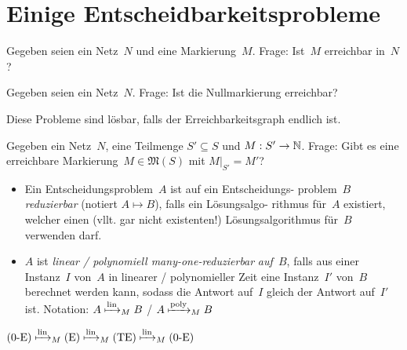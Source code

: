 \documentclass{cheat-sheet}
\newcommand{\Markings}{\mathfrak{M}} %
\newcommand{\reducesTo}{\mapsto} %
\newcommand{\reducesManyOneToLin}{\xmapsto{\mathrm{lin}}_M} %
\newcommand{\reducesManyOneToPoly}{\xmapsto{\mathrm{poly}}_M} %
\begin{document}

\section{Einige Entscheidbarkeitsprobleme}

\begin{problem}
  Gegeben seien ein Netz~$N$ und eine Markierung~$M$.
  Frage: Ist~$M$ erreichbar in~$N$?
\end{problem}

\begin{problem}
  Gegeben seien ein Netz~$N$.
  Frage: Ist die Nullmarkierung erreichbar?
\end{problem}

\begin{bem}
  Diese Probleme sind lösbar, falls der Erreichbarkeitsgraph endlich ist.
\end{bem}

\begin{problem}
  Gegeben ein Netz~$N$, eine Teilmenge $S' \subseteq S$ und $M : S' \to \mathbb{N}$.
  Frage: Gibt es eine erreichbare Markierung~$M \in \Markings(S)$ mit $M|_{S'} = M'$?
\end{problem}


\begin{defn}
  \begin{itemize}
    \item Ein Entscheidungsproblem~$A$ ist auf ein Entscheidungs- problem~$B$ \emph{reduzierbar} (notiert $A \reducesTo B$), falls ein Lösungsalgo- rithmus für~$A$ existiert, welcher einen (vllt. gar nicht existenten!) Lösungsalgorithmus für~$B$ verwenden darf.
    \item $A$ ist \emph{linear / polynomiell many-one-reduzierbar} \textit{auf~$B$}, falls aus einer Instanz~$I$ von~$A$ in linearer / polynomieller Zeit eine Instanz~$I'$ von~$B$ berechnet werden kann, sodass die Antwort auf~$I$ gleich der Antwort auf~$I'$ ist.
    Notation: $A \reducesManyOneToLin B$ / $A \reducesManyOneToPoly B$
  \end{itemize}
\end{defn}

\begin{satz}
  $\text{(0-E)} \reducesManyOneToLin \text{(E)} \reducesManyOneToLin \text{(TE)}  \reducesManyOneToLin \text{(0-E)}$
\end{satz}
\end{document}
